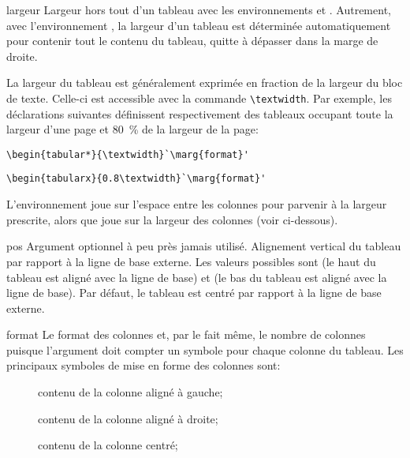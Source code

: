 \begin{list}{}{%
    \setlength{\labelsep}{1.5ex}
    \setlength{\leftmargin}{\labelwidth}
    \addtolength{\leftmargin}{\labelsep}
    \setlength{\parsep}{0.5ex plus0.2ex minus0.2ex}
    \setlength{\itemsep}{0.3ex}
    \renewcommand{\makelabel}[1]{\meta{#1}\hfill}}
%
\item[largeur] Largeur hors tout d'un tableau avec les
  environnements  et . Autrement,
  avec l'environnement , la largeur d'un tableau est
  déterminée automatiquement pour contenir tout le contenu du tableau,
  quitte à dépasser dans la marge de droite.

  La largeur du tableau est généralement exprimée en fraction de la
  largeur du bloc de texte. Celle-ci est accessible avec la commande
  \verb=\textwidth=. Par exemple, les déclarations suivantes
  définissent respectivement des tableaux occupant toute la largeur
  d'une page et 80~\% de la largeur de la page:
\begin{lstlisting}
\begin{tabular*}{\textwidth}`\marg{format}'
\end{lstlisting}
\begin{lstlisting}
\begin{tabularx}{0.8\textwidth}`\marg{format}'
\end{lstlisting}
  L'environnement  joue sur l'espace entre les colonnes
  pour parvenir à la largeur prescrite, alors que  joue
  sur la largeur des colonnes (voir ci-dessous).
\item[pos] Argument optionnel à peu près jamais utilisé. Alignement
  vertical du tableau par rapport à la ligne de base externe. Les
  valeurs possibles sont  (le haut du tableau est aligné avec
  la ligne de base) et  (le bas du tableau est aligné avec la
  ligne de base). Par défaut, le tableau est centré par rapport à la
  ligne de base externe.
\item[format] Le format des colonnes et, par le fait même, le nombre
  de colonnes puisque l'argument doit compter un symbole pour chaque
  colonne du tableau. Les principaux symboles de mise en forme des
  colonnes sont:
  \begin{description}
  \item[\normalfont{}] contenu de la colonne aligné à gauche;
  \item[\normalfont{}] contenu de la colonne aligné à droite;
  \item[\normalfont{}] contenu de la colonne centré;

\end{description}
\end{list}
